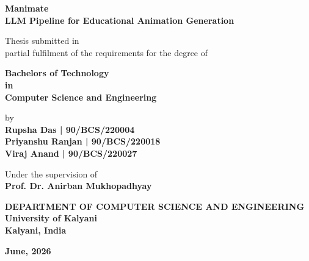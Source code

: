 \documentclass[12pt,a4paper,twoside,openright]{report}
\begin{document}
\begin{titlepage}
    \centering
    {\Huge\bfseries Manimate\\[0.3em] LLM Pipeline for Educational Animation Generation \par}
    
    \vspace{1cm}
    {\large Thesis submitted in \\ partial fulfilment of the requirements for the degree of \par}
    
    \vspace{1.5cm}
    {\Large\bfseries Bachelors of Technology \\ \large in \\ \Large\bfseries Computer Science and Engineering \par}
    
    \vspace{2cm}
    {\large by \\ \bfseries Rupsha Das | 90/BCS/220004 \\ Priyanshu Ranjan | 90/BCS/220018 \\Viraj Anand | 90/BCS/220027 \\ \par}
    
    \vspace{1.5cm}
    {\large Under the supervision of \\ \bfseries Prof. Dr. Anirban Mukhopadhyay \par}
    
    \vfill
    {\large \bfseries \MakeUppercase{Department of Computer Science and Engineering} \\ University of Kalyani \\ Kalyani, India \par}
    
    \vspace{1cm}
    {\large\bfseries June, 2026 \par}
\end{titlepage}

\cleardoublepage


\end{document}
